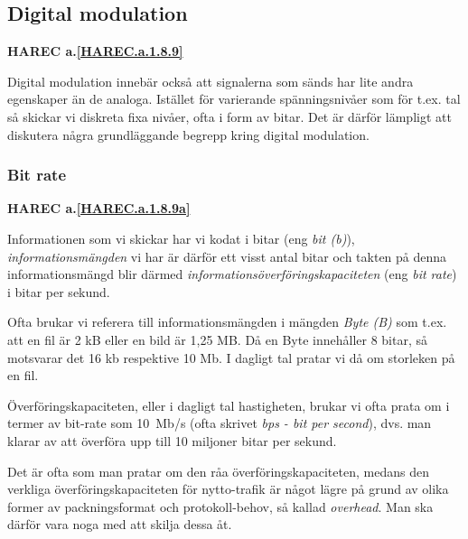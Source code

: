 \subsection{Digital modulation}
\textbf{HAREC a.\ref{HAREC.a.1.8.9}\label{myHAREC.a.1.8.9}}
\begin{rev-nytt}[MAD]

Digital modulation innebär också att signalerna som sänds har lite andra
egenskaper än de analoga. Istället för varierande spänningsnivåer som för
t.ex. tal så skickar vi diskreta fixa nivåer, ofta i form av bitar. Det är
därför lämpligt att diskutera några grundläggande begrepp kring digital
modulation.

\end{rev-nytt}

\subsubsection{Bit rate}
\textbf{HAREC a.\ref{HAREC.a.1.8.9a}\label{myHAREC.a.1.8.9a}}
\begin{rev-nytt}[MAD]

Informationen som vi skickar har vi kodat i bitar (eng \emph{bit (b)}),
\emph{informationsmängden} vi har är därför ett visst antal bitar och takten på
denna informationsmängd blir därmed \emph{informationsöverföringskapaciteten}
(eng \emph{bit rate}) i bitar per sekund.

Ofta brukar vi referera till informationsmängden i mängden \emph{Byte (B)}
som t.ex. att en fil är 2 kB eller en bild är 1,25 MB. Då en Byte innehåller
8 bitar, så motsvarar det 16 kb respektive 10 Mb. I dagligt tal pratar vi då om
storleken på en fil.

Överföringskapaciteten, eller i dagligt tal hastigheten, brukar vi ofta prata
om i termer av bit-rate som 10~Mb/s (ofta skrivet \emph{bps - bit per second}),
dvs. man klarar av att överföra upp till 10 miljoner bitar per sekund.

Det är ofta som man pratar om den råa överföringskapaciteten, medans den
verkliga överföringskapaciteten för nytto-trafik är något lägre på grund av
olika former av packningsformat och protokoll-behov, så kallad \emph{overhead}.
Man ska därför vara noga med att skilja dessa åt.

\end{rev-nytt}

